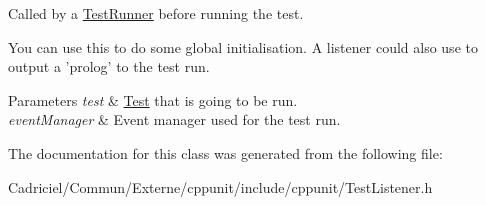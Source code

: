 Called by a \hyperlink{class_test_runner}{Test\-Runner} before running the test. 

You can use this to do some global initialisation. A listener could also use to output a 'prolog' to the test run.


\begin{DoxyParams}{Parameters}
{\em test} & \hyperlink{class_test}{Test} that is going to be run. \\
\hline
{\em event\-Manager} & Event manager used for the test run. \\
\hline
\end{DoxyParams}


The documentation for this class was generated from the following file\-:\begin{DoxyCompactItemize}
\item 
Cadriciel/\-Commun/\-Externe/cppunit/include/cppunit/Test\-Listener.\-h\end{DoxyCompactItemize}

